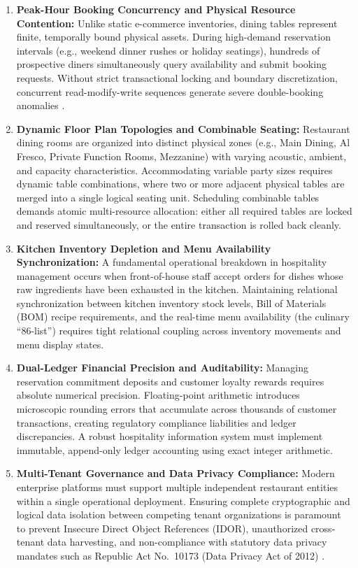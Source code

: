 \begin{enumerate}[label=\textbf{C\arabic*.}]
    \item \textbf{Peak-Hour Booking Concurrency and Physical Resource Contention:} Unlike static e-commerce inventories, dining tables represent finite, temporally bound physical assets. During high-demand reservation intervals (e.g., weekend dinner rushes or holiday seatings), hundreds of prospective diners simultaneously query availability and submit booking requests. Without strict transactional locking and boundary discretization, concurrent read-modify-write sequences generate severe double-booking anomalies \parencite{papadimitriou1979serializability, gray1993transaction}.
    \item \textbf{Dynamic Floor Plan Topologies and Combinable Seating:} Restaurant dining rooms are organized into distinct physical zones (e.g., Main Dining, Al Fresco, Private Function Rooms, Mezzanine) with varying acoustic, ambient, and capacity characteristics. Accommodating variable party sizes requires dynamic table combinations, where two or more adjacent physical tables are merged into a single logical seating unit. Scheduling combinable tables demands atomic multi-resource allocation: either all required tables are locked and reserved simultaneously, or the entire transaction is rolled back cleanly.
    \item \textbf{Kitchen Inventory Depletion and Menu Availability Synchronization:} A fundamental operational breakdown in hospitality management occurs when front-of-house staff accept orders for dishes whose raw ingredients have been exhausted in the kitchen. Maintaining relational synchronization between kitchen inventory stock levels, Bill of Materials (BOM) recipe requirements, and the real-time menu availability (the culinary ``86-list'') requires tight relational coupling across inventory movements and menu display states.
    \item \textbf{Dual-Ledger Financial Precision and Auditability:} Managing reservation commitment deposits and customer loyalty rewards requires absolute numerical precision. Floating-point arithmetic introduces microscopic rounding errors that accumulate across thousands of customer transactions, creating regulatory compliance liabilities and ledger discrepancies. A robust hospitality information system must implement immutable, append-only ledger accounting using exact integer arithmetic.
    \item \textbf{Multi-Tenant Governance and Data Privacy Compliance:} Modern enterprise platforms must support multiple independent restaurant entities within a single operational deployment. Ensuring complete cryptographic and logical data isolation between competing tenant organizations is paramount to prevent Insecure Direct Object References (IDOR), unauthorized cross-tenant data harvesting, and non-compliance with statutory data privacy mandates such as Republic Act No.~10173 (Data Privacy Act of 2012) \parencite{ra10173, owasp2021top10}.
\end{enumerate}

